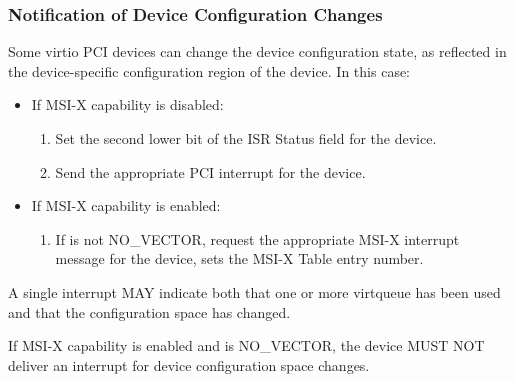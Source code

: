 \subsubsection{Notification of Device Configuration Changes}\label{sec:Virtio Transport Options / Virtio Over PCI Bus / PCI-specific Initialization And Device Operation / Notification of Device Configuration Changes}

Some virtio PCI devices can change the device configuration
state, as reflected in the device-specific configuration region of the device. In this case:

\begin{itemize}
  \item If MSI-X capability is disabled:
    \begin{enumerate}
    \item Set the second lower bit of the ISR Status field for the device.

    \item Send the appropriate PCI interrupt for the device.
    \end{enumerate}

  \item If MSI-X capability is enabled:
    \begin{enumerate}
    \item If  is not NO_VECTOR,
      request the appropriate MSI-X interrupt message for the
      device,  sets the MSI-X Table entry
      number.
    \end{enumerate}
\end{itemize}

A single interrupt MAY indicate both that one or more virtqueue has
been used and that the configuration space has changed.


If MSI-X capability is enabled and  is
NO_VECTOR, the device MUST NOT deliver an interrupt
for device configuration space changes.


